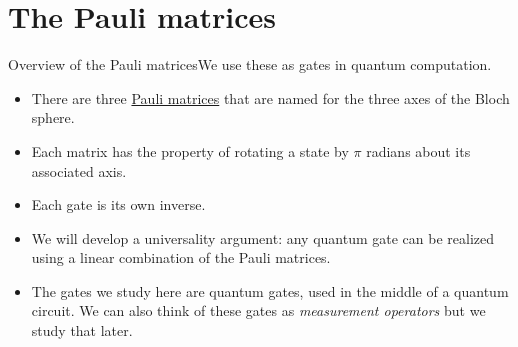 
\section{The Pauli matrices}

\begin{frame}{Overview of the Pauli matrices}{We use these as gates in quantum computation.}

\begin{itemize}
    \item There are three \href{https://en.wikipedia.org/wiki/Pauli_matrices}{Pauli matrices} that are named for the three axes of the Bloch sphere.
    \item Each matrix has the property of rotating a state by $\pi$ radians about its associated axis.
    \item Each gate is its own inverse.
    \item We will develop a universality argument:  any quantum gate can be realized using a linear combination of the Pauli matrices.
    \item The gates we study here are quantum gates, used in the middle of a quantum circuit.  We can also think of these gates as \emph{measurement operators} but we study that later.
\end{itemize}
    
\end{frame}

